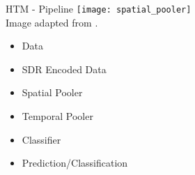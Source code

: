 \begin{frame}[c]{HTM - Pipeline}
    \texttt{[image: spatial\_pooler]} \\
    \normalsize
    Image adapted from \cite{cui2017htm}. \\
    \large
    \begin{itemize}[<+(1)->]
        \item Data
        \item SDR Encoded Data
        \item Spatial Pooler
        \item Temporal Pooler
        \item Classifier
        \item Prediction/Classification
    \end{itemize}
\end{frame}


